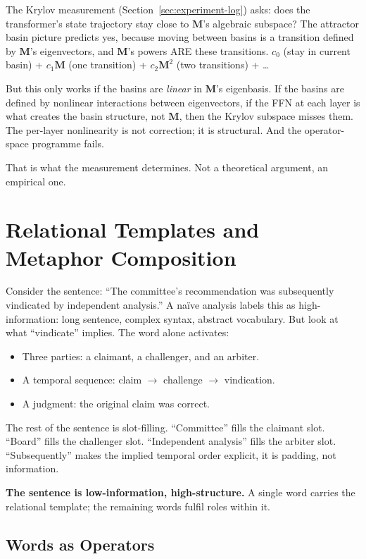 \documentclass[11pt, a4paper]{article}
\newcommand{\M}{\mathbf{M}}
\theoremstyle{plain}
\theoremstyle{definition}
\theoremstyle{remark}
\begin{document}
The Krylov measurement (Section~\ref{sec:experiment-log}) asks: does the transformer's state trajectory stay close to $\M$'s algebraic subspace?
The attractor basin picture predicts yes, because moving between basins is a transition defined by $\M$'s eigenvectors, and $\M$'s powers ARE these transitions.
$c_0$ (stay in current basin) + $c_1\M$ (one transition) + $c_2\M^2$ (two transitions) + \ldots

But this only works if the basins are \emph{linear} in $\M$'s eigenbasis.
If the basins are defined by nonlinear interactions between eigenvectors, if the FFN at each layer is what creates the basin structure, not $\M$, then the Krylov subspace misses them.
The per-layer nonlinearity is not correction; it is structural.
And the operator-space programme fails.

That is what the measurement determines.
Not a theoretical argument, an empirical one.


\section{Relational Templates and Metaphor Composition}
\label{sec:relational-templates}

Consider the sentence: ``The committee's recommendation was subsequently vindicated by independent analysis.''
A na\"ive analysis labels this as high-information: long sentence, complex syntax, abstract vocabulary.
But look at what ``vindicate'' implies.
The word alone activates:
\begin{itemize}[nosep]
\item Three parties: a claimant, a challenger, and an arbiter.
\item A temporal sequence: claim $\to$ challenge $\to$ vindication.
\item A judgment: the original claim was correct.
\end{itemize}
The rest of the sentence is slot-filling.
``Committee'' fills the claimant slot.
``Board'' fills the challenger slot.
``Independent analysis'' fills the arbiter slot.
``Subsequently'' makes the implied temporal order explicit, it is padding, not information.

\textbf{The sentence is low-information, high-structure.}
A single word carries the relational template; the remaining words fulfil roles within it.

\subsection{Words as Operators}
\end{document}
